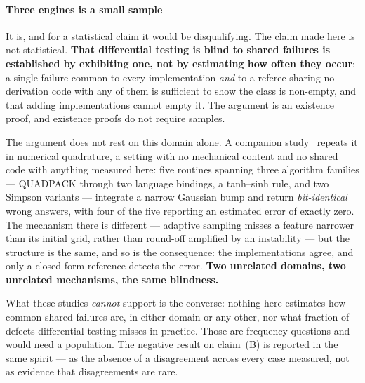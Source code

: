 \documentclass[review,12pt]{elsarticle}
\begin{document}
\paragraph{Three engines is a small sample}
It is, and for a statistical claim it would be disqualifying. The claim made
here is not statistical. \textbf{That differential testing is blind to shared
failures is established by exhibiting one, not by estimating how often they
occur}: a single failure common to every implementation \emph{and} to a referee
sharing no derivation code with any of them is sufficient to show the class is
non-empty, and that adding implementations cannot empty it. The argument is an
existence proof, and existence proofs do not require samples.

The argument does not rest on this domain alone. A companion study~\cite{parsons2026quad}
repeats it in numerical quadrature, a setting with no mechanical content and no
shared code with anything measured here: five routines spanning three algorithm
families --- QUADPACK through two language bindings, a tanh--sinh rule, and two
Simpson variants --- integrate a narrow Gaussian bump and return \emph{bit-identical}
wrong answers, with four of the five reporting an estimated error of exactly
zero. The mechanism there is different --- adaptive sampling misses a feature
narrower than its initial grid, rather than round-off amplified by an
instability --- but the structure is the same, and so is the consequence: the
implementations agree, and only a closed-form reference detects the error.
\textbf{Two unrelated domains, two unrelated mechanisms, the same blindness.}

What these studies \emph{cannot} support is the converse: nothing here estimates
how common shared failures are, in either domain or any other, nor what
fraction of defects differential testing misses in practice. Those are frequency
questions and would need a population. The negative result on claim~(B) is
reported in the same spirit --- as the absence of a disagreement across every
case measured, not as evidence that disagreements are rare.
\end{document}
